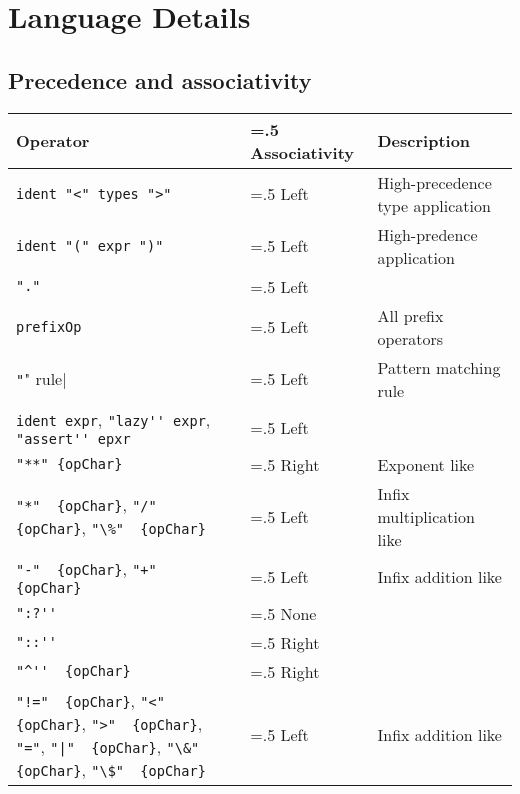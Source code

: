 \chapter{Language Details}

\section{Precedence and associativity}
\begin{table}
  \centering
  \begin{tabularx}{\linewidth}{|>{\hsize=1\hsize\raggedright\arraybackslash}X|>{\hsize=.5\hsize}X|>{\hsize=1.5\hsize}X|}
    \hline
    Operator & Associativity & Description\\
    \hline
    \lstinline[language=ebnf]|ident "<" types ">"| & Left & High-precedence type application\\
    \hline
    \lstinline[language=ebnf]|ident "(" expr ")"| & Left & High-predence application\\
    \hline
    \lstinline[language=ebnf]|"."| & Left & \\
    \hline
    \lstinline[language=ebnf]|prefixOp| & Left & All prefix operators\\
    \hline
    \lstinline[language=ebnf]|"|" rule| & Left & Pattern matching rule\\
    \hline
    \mbox{\lstinline[language=ebnf]|ident expr|,} \mbox{\lstinline[language=ebnf]|"lazy'' expr|,} \mbox{\lstinline[language=ebnf]|"assert'' epxr|} & Left & \\
    \hline
    \lstinline[language=ebnf]|"**" {opChar}| & Right & Exponent like\\
    \hline
    \mbox{\lstinline[language=ebnf]|"*"  {opChar}|,} \mbox{\lstinline[language=ebnf]|"/"  {opChar}|,} \mbox{\lstinline[language=ebnf]|"\%"  {opChar}|} & Left & Infix multiplication like\\
     \hline
    \mbox{\lstinline[language=ebnf]|"-"  {opChar}|,} \mbox{\lstinline[language=ebnf]|"+"  {opChar}|} & Left & Infix addition like\\
     \hline
     \lstinline[language=ebnf]|":?''| & None & \\
     \hline
     \lstinline[language=ebnf]|"::''| & Right & \\
     \hline
     \lstinline[language=ebnf]|"^''  {opChar}| & Right & \\
     \hline
    \mbox{\lstinline[language=ebnf]|"!="  {opChar}|,} \mbox{\lstinline[language=ebnf]|"<"  {opChar}|,} \mbox{\lstinline[language=ebnf]|">"  {opChar}|,} \mbox{\lstinline[language=ebnf]|"="|,} \mbox{\lstinline[language=ebnf]!"|"  {opChar}!,} \mbox{\lstinline[language=ebnf]|"\&"  {opChar}|,} \mbox{\lstinline[language=ebnf]|"\$"  {opChar}|} & Left & Infix addition like\\

\end{tabularx}
\end{table}
